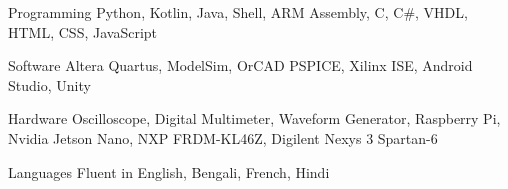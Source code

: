 


\begin{cvskills}


\cvskill
{Programming} %
{Python, Kotlin, Java, Shell, ARM Assembly, C, C\#, VHDL, HTML, CSS, JavaScript} %


\cvskill
{Software} %
{Altera Quartus, ModelSim, OrCAD PSPICE, Xilinx ISE, Android Studio, Unity} %


\cvskill
{Hardware} %
{Oscilloscope, Digital Multimeter, Waveform Generator, Raspberry Pi, Nvidia Jetson Nano, NXP FRDM-KL46Z, Digilent Nexys 3 Spartan-6} %


\cvskill
{Languages} %
{Fluent in English, Bengali, French, Hindi} %



\end{cvskills}